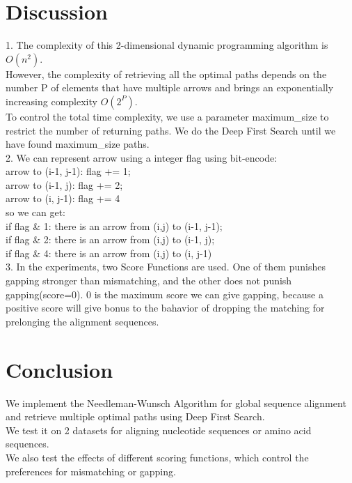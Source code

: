 \documentclass[a4paper, 12pt, one column]{article}
\begin{document}
\section{Discussion}
1. The complexity of this 2-dimensional dynamic programming algorithm is $O(n^2)$. \\
However, the complexity of retrieving all the optimal paths depends on the number P of elements that have multiple arrows and brings an exponentially increasing complexity $O(2^P)$. \\
To control the total time complexity, we use a parameter maximum\_size to restrict the number of returning paths. We do the Deep First Search until we have found maximum\_size paths.\\
2. We can represent arrow using a integer flag using bit-encode:\\
arrow to (i-1, j-1): flag += 1;\\
arrow to (i-1, j): flag += 2;\\
arrow to (i, j-1): flag += 4\\
so we can get:\\
if flag \& 1: there is an arrow from (i,j) to (i-1, j-1);\\
if flag \& 2: there is an arrow from (i,j) to (i-1, j);\\
if flag \& 4: there is an arrow from (i,j) to (i, j-1)\\
3. In the experiments, two Score Functions are used. One of them punishes gapping stronger than mismatching, and the other does not punish gapping(score=0). 0 is the maximum score we can give gapping, because a positive score will give bonus to the bahavior of dropping the matching for prelonging the alignment sequences.
\section{Conclusion}
We implement the Needleman-Wunsch Algorithm for global sequence alignment and retrieve multiple optimal paths using Deep First Search. \\We test it on 2 datasets for aligning nucleotide sequences or amino acid sequences. \\We also test the effects of different scoring functions, which control the preferences for mismatching or gapping.

\end{document}
